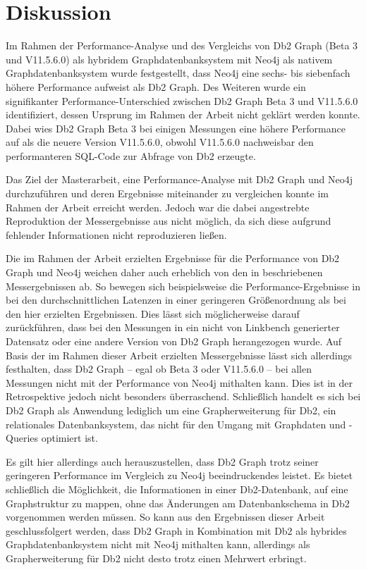 \chapter{Diskussion}
\label{diskussion}
Im Rahmen der Performance-Analyse und des Vergleichs von Db2 Graph (Beta 3 und V11.5.6.0) als hybridem Graphdatenbanksystem mit Neo4j als nativem Graphdatenbanksystem wurde festgestellt, dass Neo4j eine sechs- bis siebenfach höhere Performance aufweist als Db2 Graph. Des Weiteren wurde ein signifikanter Performance-Unterschied zwischen Db2 Graph Beta 3 und V11.5.6.0 identifiziert, dessen Ursprung im Rahmen der Arbeit nicht geklärt werden konnte. Dabei wies Db2 Graph Beta 3 bei einigen Messungen eine höhere Performance auf als die neuere Version V11.5.6.0, obwohl V11.5.6.0 nachweisbar den performanteren SQL-Code zur Abfrage von Db2 erzeugte. 

Das Ziel der Masterarbeit, eine Performance-Analyse mit Db2 Graph und Neo4j durchzuführen und deren Ergebnisse miteinander zu vergleichen konnte im Rahmen der Arbeit erreicht werden. Jedoch war die dabei angestrebte Reproduktion der Messergebnisse aus \cite{sigmod_tian} nicht möglich, da sich diese aufgrund fehlender Informationen nicht reproduzieren ließen. 

Die im Rahmen der Arbeit erzielten Ergebnisse für die Performance von Db2 Graph und Neo4j weichen daher auch erheblich von den in \cite{sigmod_tian} beschriebenen Messergebnissen ab. So bewegen sich beispielsweise die Performance-Ergebnisse in \cite{sigmod_tian} bei den durchschnittlichen Latenzen in einer geringeren Größenordnung als bei den hier erzielten Ergebnissen. Dies lässt sich möglicherweise darauf zurückführen, dass bei den Messungen in \cite{sigmod_tian} ein nicht von Linkbench generierter Datensatz oder eine andere Version von Db2 Graph herangezogen wurde. Auf Basis der im Rahmen dieser Arbeit erzielten Messergebnisse lässt sich allerdings festhalten, dass Db2 Graph -- egal ob Beta 3 oder V11.5.6.0 -- bei allen Messungen nicht mit der Performance von Neo4j mithalten kann. Dies ist in der Retrospektive jedoch nicht besonders überraschend. Schließlich handelt es sich bei Db2 Graph als Anwendung lediglich um eine Grapherweiterung für Db2, ein relationales Datenbanksystem, das nicht für den Umgang mit Graphdaten und -Queries optimiert ist. 

Es gilt hier allerdings auch herauszustellen, dass Db2 Graph trotz seiner geringeren Performance im Vergleich zu Neo4j beeindruckendes leistet. Es bietet schließlich die Möglichkeit, die Informationen in einer Db2-Datenbank, auf eine Graphstruktur zu mappen, ohne das Änderungen am Datenbankschema in Db2 vorgenommen werden müssen. So kann aus den Ergebnissen dieser Arbeit geschlussfolgert werden, dass Db2 Graph in Kombination mit Db2 als hybrides Graphdatenbanksystem nicht mit Neo4j mithalten kann, allerdings als Grapherweiterung für Db2 nicht desto trotz einen Mehrwert erbringt. 

